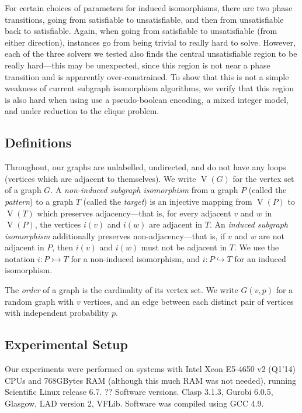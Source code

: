 \documentclass[letterpaper]{article}
\begin{document}
For certain choices of parameters for induced isomorphisms, there are two phase transitions, going
from satisfiable to unsatisfiable, and then from unsatisfiable back to satisfiable. Again, when
going from satisfiable to unsatisfiable (from either direction), instances go from being trivial to
really hard to solve. However, each of the three solvers we tested also finds the central
unsatisfiable region to be really hard---this may be unexpected, since this region is not near a
phase transition and is apparently over-constrained. To show that this is not a simple weakness of
current subgraph isomorphism algorithms, we verify that this region is also hard when using use a
pseudo-boolean encoding, a mixed integer model, and under reduction to the clique problem.

\subsection{Definitions}

Throughout, our graphs are unlabelled, undirected, and do not have any loops (vertices which are
adjacent to themselves). We write $\operatorname{V}(G)$ for the vertex set of a graph $G$. A
\emph{non-induced subgraph isomorphism} from a graph $P$ (called the \emph{pattern}) to a graph $T$
(called the \emph{target}) is an injective mapping from $\operatorname{V}(P)$ to
$\operatorname{V}(T)$ which preserves adjacency---that is, for every adjacent $v$ and $w$ in
$\operatorname{V}(P)$, the vertices $i(v)$ and $i(w)$ are adjacent in $T$. An \emph{induced subgraph
isomorphism} additionally preserves non-adjacency---that is, if $v$ and $w$ are not adjacent in $P$,
then $i(v)$ and $i(w)$ must not be adjacent in $T$. We use the notation $i : P \rightarrowtail T$
for a non-induced isomorphism, and $i : P \hookrightarrow T$ for an induced isomorphism.

The \emph{order} of a graph is the cardinality of its vertex set.  We write $G(v, p)$ for a random
graph with $v$ vertices, and an edge between each distinct pair of vertices with independent
probability $p$.

\subsection{Experimental Setup}

Our experiments were performed on systems with Intel Xeon E5-4650 v2 (Q1'14) CPUs and 768GBytes RAM
(although this much RAM was not needed), running Scientific Linux release 6.7.   ?? Software
versions. Clasp 3.1.3, Gurobi 6.0.5, Glasgow, LAD version 2, VFLib. Software was compiled using GCC
4.9.
\end{document}
